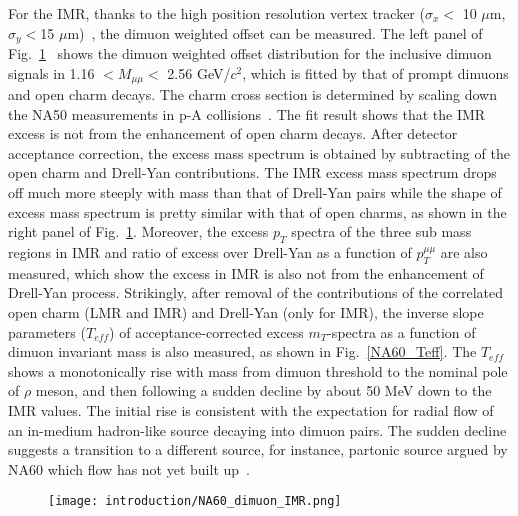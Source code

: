 For the IMR, thanks to the high position resolution vertex tracker ($\sigma_{x}<$ 10 $\mu$m, $\sigma_{y}<$15 $\mu$m)~\cite{NA60:dimuon2}, the dimuon weighted offset can be measured. The left panel of Fig.~\ref{NA60_IMRdimuon}~\cite{NA60:dimuon2,NA60:dimuon5} shows the dimuon weighted offset distribution for the inclusive dimuon signals in 1.16 $<M_{\mu\mu}<$ 2.56 GeV/$c^{2}$, which is fitted by that of prompt dimuons and open charm decays. The charm cross section is determined by scaling down the NA50 measurements in p-A collisions~\cite{NA50:dimuon}. The fit result shows that the IMR excess is not from the enhancement of open charm decays. After detector acceptance correction, the excess mass spectrum is obtained by subtracting of the open charm and Drell-Yan contributions. The IMR excess mass spectrum drops off much more steeply with mass than that of Drell-Yan pairs while the shape of excess mass spectrum is pretty similar with that of open charms, as shown in the right panel of Fig.~\ref{NA60_IMRdimuon}. Moreover, the excess $p_{T}$ spectra of the three sub mass regions in IMR and ratio of excess over Drell-Yan as a function of $p_{T}^{\mu\mu}$ are also measured, which show the excess in IMR is also not from the enhancement of Drell-Yan process. Strikingly, after removal of the contributions of the correlated open charm (LMR and IMR) and Drell-Yan (only for IMR), the inverse slope parameters ($T_{eff}$) of acceptance-corrected excess $m_{T}$-spectra as a function of  dimuon invariant mass is also measured, as shown in Fig.~\ref{NA60_Teff}. The $T_{eff}$ shows a monotonically rise with mass from dimuon threshold to the nominal pole of $\rho$ meson, and then following a sudden decline by about 50 MeV down to the IMR values. The initial rise is consistent with the expectation for radial flow of an in-medium hadron-like source decaying into dimuon pairs. The sudden decline suggests a transition to a different source, for instance, partonic source argued by NA60 which flow has not yet built up~\cite{NA60:dimuon1,NA60:dimuon2,NA60:dimuon3}.

\begin{figure}[htbp]
\centering
\texttt{[image: introduction/NA60\_dimuon\_IMR.png]}
 \label{NA60_IMRdimuon}
\end{figure}

